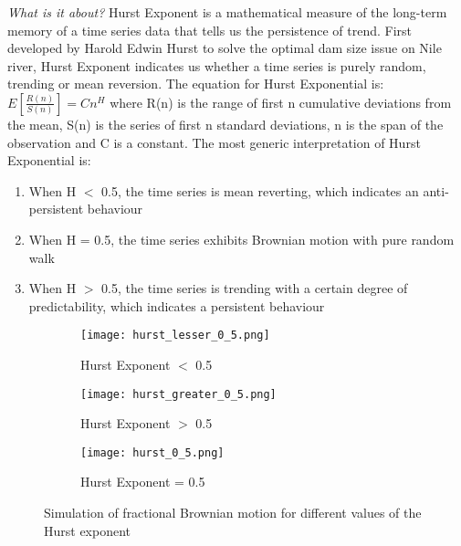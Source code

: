 \documentclass{article}
\begin{document}
\textit{What is it about?}
Hurst Exponent is a mathematical measure of the long-term memory of a time series data that tells us the persistence of trend. First developed by Harold Edwin Hurst to solve the optimal dam size issue on Nile river, Hurst Exponent indicates us whether a time series is purely random, trending or mean reversion.
\newline
\newline
The equation for Hurst Exponential is: \(E\left[\frac{R(n)}{S(n)}\right] = Cn^H\)
\newline
where R(n) is the range of first n cumulative deviations from the mean, S(n) is the series of first n standard deviations, n is the span of the observation and C is a constant.
\newpage
The most generic interpretation of Hurst Exponential is:
\begin{enumerate}
\item When H \(<\) 0.5, the time series is mean reverting, which indicates an anti-persistent behaviour
\item When H = 0.5, the time series exhibits Brownian motion with pure random walk
\item When H \(>\) 0.5, the time series is trending with a certain degree of predictability, which indicates a persistent behaviour
\end{enumerate}

\begin{figure}[h]
  \centering
  \begin{subfigure}{0.3\textwidth}
    \centering
    \texttt{[image: hurst\_lesser\_0\_5.png]}
    \caption{Hurst Exponent $<$ 0.5}
  \end{subfigure}
  \hspace{0.05\textwidth} %
  \begin{subfigure}{0.3\textwidth}
    \centering
    \texttt{[image: hurst\_greater\_0\_5.png]}
    \caption{Hurst Exponent $>$ 0.5}
  \end{subfigure}
  \hspace{0.05\textwidth} %
  \begin{subfigure}{0.3\textwidth}
    \centering
    \texttt{[image: hurst\_0\_5.png]}
    \caption{Hurst Exponent = 0.5}
  \end{subfigure}
  \caption{Simulation of fractional Brownian motion for different values of the Hurst exponent}
\end{figure}
\end{document}
